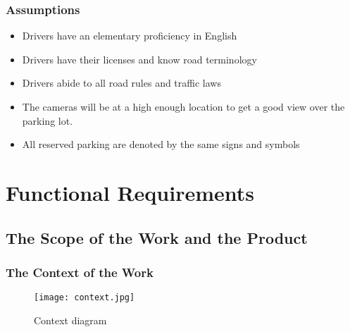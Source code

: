 \documentclass[12pt,letterpaper]{article}
\begin{document}
\subsubsection{Assumptions}
\begin{itemize}
    \item Drivers have an elementary proficiency in English
    \item Drivers have their licenses and know road terminology
    \item Drivers abide to all road rules and traffic laws
    \item The cameras will be at a high enough location to get a good view over
    the parking lot.
    \item All reserved parking are denoted by the same signs and symbols
\end{itemize}

\newpage
\section{Functional Requirements}

\subsection{The Scope of the Work and the Product}
\subsubsection{The Context of the Work}
\begin{figure}[ht]
    \texttt{[image: context.jpg]}
    \caption{Context diagram}
\end{figure}

\newpage
\clearpage
\end{document}
